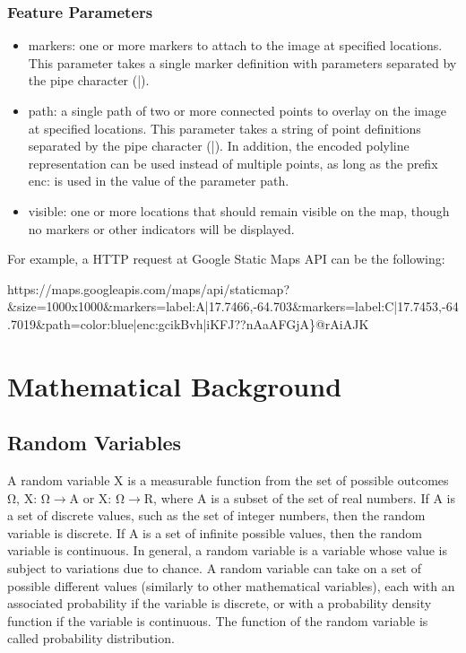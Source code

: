 \subsubsection{Feature Parameters}

\begin{itemize}
 \item markers: one or more markers to attach to the image at specified locations. This parameter takes a single marker definition with parameters separated 
 by the pipe character (|). 
 \item path: a single path of two or more connected points to overlay on the image at specified locations. This parameter takes a string of point definitions 
 separated by the pipe character (|). In addition, the encoded polyline representation can be used instead of multiple points, as long as the prefix enc: 
 is used in the value of the parameter path.
 \item visible: one or more locations that should remain visible on the map, though no markers or other indicators will be displayed. 
\end{itemize}

For example, a HTTP request at Google Static Maps API can be the following:

\begin{center}
 https://maps.googleapis.com/maps/api/staticmap?\&size=1000x1000\&markers=label:A|17.7466,-64.703\&markers=label:C|17.7453,-64.7019\&path=color:blue|enc:gcikBvh|iKFJ??nAaAFGjA\}@rAiAJK
\end{center}

\section{Mathematical Background}

\subsection{Random Variables}

A random variable X is a measurable function from the set of possible outcomes Ω, Χ: Ω\(\rightarrow\)A or Χ: Ω\(\rightarrow\)R, where A is a 
subset of the set of real numbers. If A is a set of discrete values, such as the set of integer numbers, then the random variable is discrete. 
If A is a set of infinite possible values, then the random variable is continuous. In general, a random variable is a variable whose value is 
subject to variations due to chance. A random variable can take on a set of possible different values (similarly to other mathematical variables), 
each with an associated probability if the variable is discrete, or with a probability density function if the variable is continuous. 
The function of the random variable is called probability distribution.

